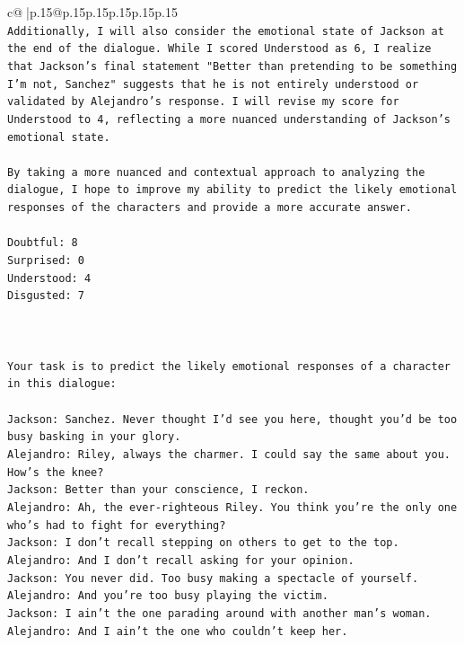 \documentclass{article}
\begin{document}
{\begin{supertabular}{c@{$\;$}|p{.15\linewidth}@{}p{.15\linewidth}p{.15\linewidth}p{.15\linewidth}p{.15\linewidth}p{.15\linewidth}}
{{{\\ 
\texttt{Additionally, I will also consider the emotional state of Jackson at the end of the dialogue. While I scored Understood as 6, I realize that Jackson's final statement "Better than pretending to be something I'm not, Sanchez" suggests that he is not entirely understood or validated by Alejandro's response. I will revise my score for Understood to 4, reflecting a more nuanced understanding of Jackson's emotional state.} \\
\\ 
\texttt{By taking a more nuanced and contextual approach to analyzing the dialogue, I hope to improve my ability to predict the likely emotional responses of the characters and provide a more accurate answer.} \\
\\ 
\texttt{Doubtful: 8} \\
\texttt{Surprised: 0} \\
\texttt{Understood: 4} \\
\texttt{Disgusted: 7} \\
\\ 
\\ 
\\ 
\texttt{Your task is to predict the likely emotional responses of a character in this dialogue:} \\
\\ 
\texttt{Jackson: Sanchez. Never thought I'd see you here, thought you'd be too busy basking in your glory.} \\
\texttt{Alejandro: Riley, always the charmer. I could say the same about you. How's the knee?} \\
\texttt{Jackson: Better than your conscience, I reckon.} \\
\texttt{Alejandro: Ah, the ever{-}righteous Riley. You think you're the only one who's had to fight for everything?} \\
\texttt{Jackson: I don't recall stepping on others to get to the top.} \\
\texttt{Alejandro: And I don't recall asking for your opinion.} \\
\texttt{Jackson: You never did. Too busy making a spectacle of yourself.} \\
\texttt{Alejandro: And you're too busy playing the victim. } \\
\texttt{Jackson: I ain't the one parading around with another man's woman.} \\
\texttt{Alejandro: And I ain't the one who couldn't keep her.} \\
}}}
\end{supertabular}}
\end{document}
